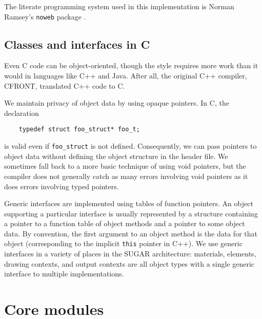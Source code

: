 The literate programming system used in this implementation is
Norman Ramsey's \verb|noweb| package \cite{Noweb-url, Rams94}.


\subsection{Classes and interfaces in C}


Even C code can be object-oriented, though the style requires more work
than it would in languages like C++ and Java.  After all, the original
C++ compiler, CFRONT, translated C++ code to C.

We maintain privacy of object data by using opaque pointers.  In C,
the declaration
\begin{verbatim}
    typedef struct foo_struct* foo_t;
\end{verbatim}
is valid even if \verb|foo_struct| is not defined.  Consequently,
we can pass pointers to object data without defining the object
structure in the header file.  We sometimes fall back to a more
basic technique of using void pointers, but the compiler does
not generally catch as many errors involving void pointers as it
does errors involving typed pointers.

Generic interfaces are implemented using tables of function pointers.
An object supporting a particular interface is usually represented
by a structure containing a pointer to a function table of object
methods and a pointer to some object data.  By convention, the first
argument to an object method is the data for that object (corresponding
to the implicit \verb|this| pointer in C++).  We use generic interfaces
in a variety of places in the SUGAR architecture: materials, elements,
drawing contexts, and output contexts are all object types with a single
generic interface to multiple implementations.


\section{Core modules}



